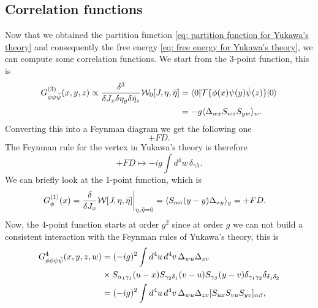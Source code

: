 \subsection{Correlation functions}
Now that we obtained the partition function \eqref{eq: partition function for Yukawa's theory} and consequently the free energy \eqref{eq: free energy for Yukawa's theory}, we can compute some correlation functions. We start from the 3-point function, this is 
\begin{equation}
    \begin{split}
        G^{(3)}_{\phi\psi\bar{\psi}}(x,y,z) \propto \frac{\delta^3}{\delta J_x\delta \eta_y\delta \bar{\eta}_z}\mathcal{W}_0[J,\eta,\bar{\eta}] &= \langle 0 | \mathcal{T}{\{\phi(x)\psi(y)\bar{\psi}(z)\}} | 0 \rangle \\
        &= -g\langle \Delta_{wx}S_{wz}S_{yw} \rangle_w.
    \end{split}
\end{equation}
Converting this into a Feynman diagram we get the following one 
\begin{equation}
    +FD.
\end{equation}
The Feynman rule for the vertex in Yukawa's theory is therefore
\begin{equation}
    +FD \mapsto -ig\int d^4w\,\delta_{\gamma\lambda}.
\end{equation}
We can briefly look at the 1-point function, which is 
\begin{equation}
    \begin{split}
        G^{(1)}_\phi(x) = \frac{\delta}{\delta J_x}\mathcal{W}[J,\eta,\bar{\eta}]\bigg|_{\eta,\bar{\eta} = 0} &= \langle S_{\alpha\alpha}(y - y)\Delta_{xy} \rangle_y = +FD.
    \end{split}
\end{equation}
Now, the 4-point function starts at order $g^2$ since at order $g$ we can not build a consistent interaction with the Feynman rules of Yukawa's theory, this is 
\begin{equation}
    \begin{split}
        G^{4}_{\phi\phi\psi\bar{\psi}}(x,y,z,w) &= (-ig)^2\int d^4u\,d^4v\,\Delta_{wu}\Delta_{zv} \\
        &\times S_{\alpha_1\gamma_1}(u - x)S_{\gamma_2\delta_1}(v - u)S_{\gamma_\beta}(y - v)\delta_{\gamma_1\gamma_2}\delta_{\delta_1\delta_2} \\
        &= (-ig)^2\int d^4u\,d^4v\,\Delta_{wu}\Delta_{zv} [S_{ux}S_{vu}S_{yv}]_{\alpha\beta},
    \end{split}
\end{equation}
